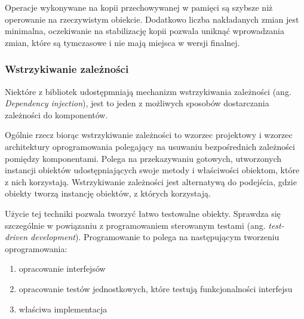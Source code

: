 \documentclass[polish, twoside, 12pt]{mwart}
\begin{document}
Operacje wykonywane na kopii przechowywanej w pamięci są szybsze niż operowanie na rzeczywistym obiekcie. Dodatkowo liczba nakładanych zmian jest minimalna, oczekiwanie na stabilizację kopii pozwala uniknąć wprowadzania zmian, które są tymczasowe i nie mają miejsca w wersji finalnej.

\subsubsection{Wstrzykiwanie zależności}

Niektóre z bibliotek udostępmniają mechanizm wstrzykiwania zależności (ang. \emph {Dependency injection}), jest to jeden z możliwych sposobów dostarczania zależności do komponentów.

Ogólnie rzecz biorąc wstrzykiwanie zależności to wzorzec projektowy i wzorzec architektury oprogramowania polegający na usuwaniu bezpośrednich zależności pomiędzy komponentami. Polega na przekazywaniu gotowych, utworzonych instancji obiektów udostępniających swoje metody i właściwości obiektom, które z nich korzystają. Wstrzykiwanie zależności jest alternatywą do podejścia, gdzie obiekty tworzą instancję obiektów, z których korzystają. 

Użycie tej techniki pozwala tworzyć łatwo testowalne obiekty. Sprawdza się szczególnie w powiązaniu z programowaniem sterowanym testami (ang. \emph{test-driven development}). Programowanie to polega na następującym tworzeniu oprogramowania:

\begin{enumerate} 
  \item opracowanie interfejsów
  \item opracowanie testów jednostkowych, które testują funkcjonalności interfejsu
  \item właściwa implementacja
\end{enumerate} 
\end{document}
